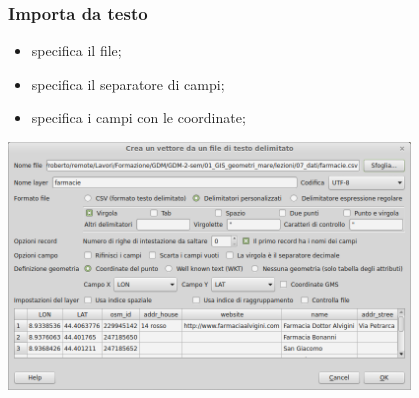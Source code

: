 \documentclass{beamer}
\begin{document}
{ \begin{frame}
   \frametitle{Importa da testo}
   \begin{itemize}
   		\item specifica il file;
   		\item specifica il separatore di campi;
   		\item specifica i campi con le coordinate;
   \end{itemize}
\begin{center}
\includegraphics[width=0.8\textwidth] {digitizing_pics/import_text.png}
\end{center}
\end{frame} 


}
\end{document}
